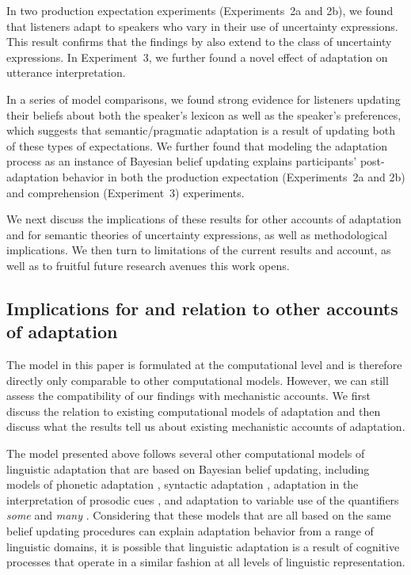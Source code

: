 \documentclass[man, floatsintext]{apa6}
\begin{document}
In two production expectation experiments (Experiments~2a and 2b), we found that listeners adapt to speakers who vary in their use of uncertainty expressions. This result confirms that 
the findings by \textcite{Yildirim2016} also extend to the class of uncertainty expressions. In Experiment~3, we further found a novel effect of adaptation on utterance interpretation.

In a series of model comparisons, we found strong evidence for listeners updating their beliefs about both the speaker's lexicon as well as the speaker's preferences, which suggests
that semantic/pragmatic adaptation is a result of updating both of these types of expectations. We further found that modeling the adaptation process as an instance of Bayesian
belief updating explains participants' post-adaptation behavior in both the production expectation (Experiments~2a and 2b) and comprehension (Experiment~3) experiments. 


We next discuss the implications of these results for other accounts of adaptation and for semantic theories of uncertainty expressions, as well as methodological implications. We then turn to limitations of the current results and account, as well as to fruitful future research avenues this work opens. 



\subsection{Implications for and relation to other accounts of adaptation}

The model in this paper is formulated at the computational level \parencite{Marr1982,Anderson1990} 
and is therefore directly only comparable to other computational models. However, we can still assess 
the compatibility of our findings with mechanistic accounts. We first discuss the relation to existing computational 
models of adaptation and then discuss what the results tell us about existing mechanistic accounts of
 adaptation.

The model presented above follows several other computational models of linguistic adaptation that are based 
on Bayesian belief updating, including models of phonetic adaptation \parencite{Kleinschmidt2015}, syntactic 
adaptation \parencite{Kleinschmidt2012}, adaptation in the interpretation of prosodic cues \parencite{Roettger2019},
and adaptation to variable use of the quantifiers \textit{some} and \textit{many} \parencite{Qing2014}.
Considering that these models that are all based on the same belief updating procedures can explain adaptation behavior 
from a range of linguistic domains, it is possible that linguistic adaptation is a result of cognitive processes that operate in 
a similar fashion at all levels of linguistic representation. 
\end{document}
